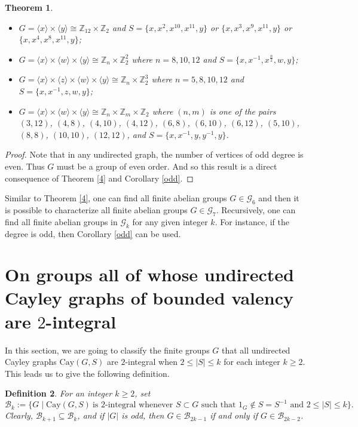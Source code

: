 \documentclass[12pt,a4paper]{article}
\newtheorem{thm}{Theorem}[section]
\newtheorem{defi}[thm]{Definition}
\def \leq {\leqslant}
\def \geq {\geqslant}
\begin{document}
\begin{thm}
\begin{itemize}
			\item[$\romannumeral11$.] $G=\langle x\rangle\times \langle y\rangle \cong \mathbb{Z}_{12}\times \mathbb{Z}_2$ and $S=\{x,x^2,x^{10},x^{11},y\}$ or $\{x,x^3,x^9,x^{11},y\}$ or $\{x,x^4,x^8,x^{11},y\}$;
			\item[$\romannumeral12$.] $G=\langle x\rangle\times \langle w\rangle\times \langle y\rangle\cong \mathbb{Z}_n\times \mathbb{Z}_2^2$ where $n=8,10,12$ and $S=\{x,x^{-1},x^{\frac{n}{2}},w,y\}$;
			\item[$\romannumeral13$.] $G=\langle x\rangle\times \langle z\rangle\times \langle w\rangle\times\langle y\rangle\cong \mathbb{Z}_n\times \mathbb{Z}_2^3$ where $n=5,8,10,12$ and $S=\{x,x^{-1},z,w,y\}$;
			\item[$\romannumeral14$.] $G=\langle x\rangle\times \langle w\rangle\times\langle y\rangle\cong \mathbb{Z}_n\times \mathbb{Z}_m\times \mathbb{Z}_2$ where $(n,m)$ is one of the pairs $(3,12)$, $(4,8)$, $(4,10)$, $(4,12)$, $(6,8)$, $(6,10)$, $(6,12)$, $(5,10)$, $(8,8)$, $(10,10)$, $(12,12)$, and $S=\{x,x^{-1},y,y^{-1},y\}$.
		\end{itemize}
	\end{thm}
	\begin{proof}
		Note that in any undirected graph, the number of vertices of odd degree is even.
		Thus $G$ must be a group of even order.
		And so this result is a direct consequence of Theorem \ref{4} and Corollary \ref{odd}.
	\end{proof}
	
	Similar to Theorem \ref{4}, one can find all finite abelian groups $G\in\mathcal{G}_6$ and then it is possible to characterize all finite abelian groups $G\in\mathcal{G}_7$. Recursively, one can find all finite abelian groups in $\mathcal{G}_k$ for any given integer $k$. For instance, if the degree is odd, then Corollary \ref{odd} can be used.
	\section{On groups all of whose undirected Cayley graphs of bounded valency are $2$-integral}		
	In this section, we are going to classify the finite groups $G$ that all undirected Cayley graphs $\mathrm{Cay}(G, S)$ are $2$-integral when $2\leq |S|\leq k$ for each integer $k\geq 2$.	
	This leads us to  give the following definition.
	
	\begin{defi}
		For an integer $k\geq 2$, set
		$$\mathcal{B}_k:=\{G\mid \mathrm{Cay}(G,S)\ \text{is $2$-integral whenever $S \subset G$ such that $1_G\notin S=S^{-1}$ and $2\leq |S|\leq k$}\}.$$
		Clearly, $\mathcal{B}_{k+1}\subseteq \mathcal{B}_k$, and if $|G|$ is odd, then $G\in \mathcal{B}_{2k-1}$ if and only if $G\in \mathcal{B}_{2k-2}$.
	\end{defi}
	
\end{document}
